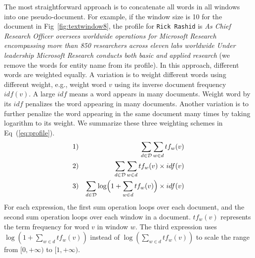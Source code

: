 \documentclass{sig-alternate}
\theoremstyle{definition}
\begin{document}
The most straightforward approach is to concatenate all words in all windows into one pseudo-document. For example, if the window size is 10 for the document in Fig~\ref{fig:textwindow8}, the profile for {\tt Rick Rashid} is {\em As Chief Research Officer oversees worldwide operations for Microsoft Research encompassing more than 850 researchers across eleven labs worldwide Under leadership Microsoft Research conducts both basic and applied research} (we remove the words for entity name from its profile). In this approach, different words are weighted equally. A variation is to weight different words using different weight, e.g., weight word $v$ using its inverse document frequency $idf(v)$. A large $idf$ means a word appears in many documents. Weight word by its $idf$ penalizes the word appearing in many documents. Another variation is to further penalize the word appearing in the same document many times by taking logarithm to its weight. We summarize these three weighting schemes in Eq~(\ref{eq:profile}).
\begin{eqnarray}\label{eq:profile}
1) && \sum_{d \in \mathcal{D}} \sum_{w \in d} tf_w(v) \nonumber \\
2) && \sum_{d \in \mathcal{D}} \sum_{w \in d} tf_w(v) \times idf(v) \\
3) && \sum_{d \in \mathcal{D}} \log\Bigl(1 + \sum_{w \in d} tf_w(v)\Bigr) \times idf(v) \nonumber
\end{eqnarray}
For each expression, the first sum operation loops over each document, and the second sum operation loops over each window in a document. $tf_w(v)$ represents the term frequency for word $v$ in window $w$. The third expression uses $\log(1 + \sum_{w \in d} tf_w(v))$ instead of $\log(\sum_{w \in d} tf_w(v))$ to scale the range from $[0, +\infty)$ to $[1, +\infty)$.
\end{document}

